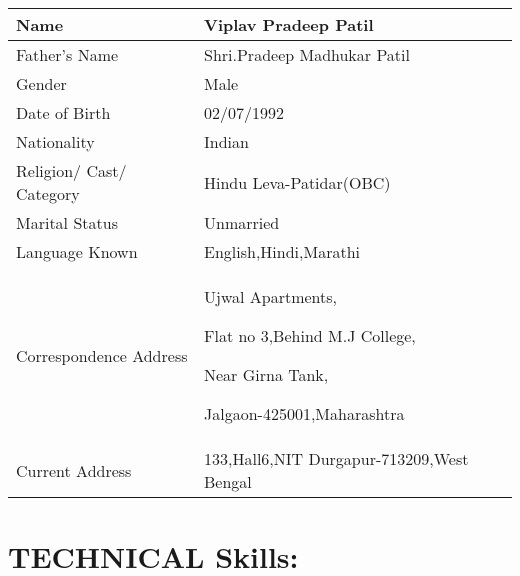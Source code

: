 \documentclass[a4paper,10pt]{article}
\begin{document}
\begin{tabu} to 1.2\textwidth { | X[l] | X[1] | }
 \hline
\large Name & Viplav Pradeep  Patil \\

\hline
\large Father’s Name   & Shri.Pradeep Madhukar Patil  \\
 
\hline
\large Gender & Male \\
 
\hline
\large Date of Birth   & 02/07/1992 \\
 
\hline
\large Nationality  & Indian \\
 
\hline
\large Religion/ Cast/ Category   & Hindu Leva-Patidar(OBC)   \\
 
\hline
\large Marital Status   & Unmarried   
\\
 
\hline
\large Language Known   & English,Hindi,Marathi 
\\
 
\hline
\large Correspondence Address &  Ujwal Apartments, 
\par Flat no 3,Behind M.J College,
\par Near Girna Tank,
\par Jalgaon-425001,Maharashtra \\
%
\hline
\large Current Address & 133,Hall6,NIT Durgapur-713209,West Bengal \\
\hline

\end{tabu}






























\section{TECHNICAL Skills:}
\end{document}

